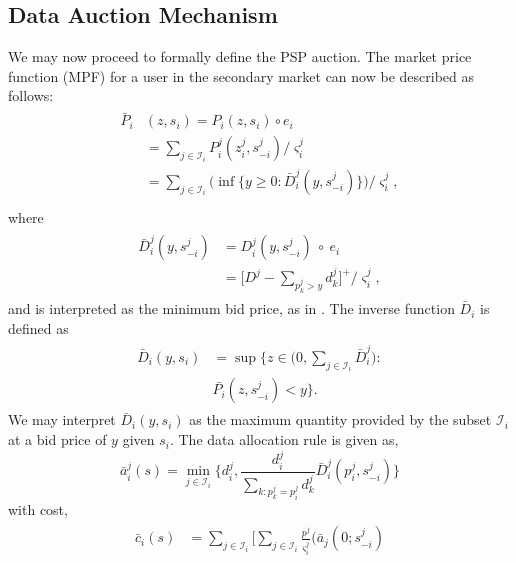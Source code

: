 \documentclass[12pt]{article}
\theoremstyle{definition}
\newcommand{\vs}{\varsigma}
\newcommand{\mcI}{\mathcal{I}}
\begin{document}
\begin{multicols}{2}
\subsection{Data Auction Mechanism}
We may now proceed to formally define the PSP auction.
The market price function (MPF) for a user in the secondary market
can now be described as follows:
\begin{align}\label{dataprice}
\begin{split}
    \bar{P}_i&(z, s_i) = P_i(z,s_i)\circ e_i \\
    &=\displaystyle\sum_{j\in\mcI_i}P_i^j(z_i^j,
s_{-i}^j)/\vs_i^j \\
    &= \sum_{j\in\mcI_i}\bigg(\inf\bigg\lbrace y\ge 0 : 
    {\bar{D}_i^j}(y,s_{-i}^j)\bigg\rbrace \bigg)/\vs_i^j,\\
\end{split}
\end{align}
where
\begin{align}
\begin{split}
    \bar{D}_i^j(y,s_{-i}^j) &= D_i^j(y,s_{-i}^j)\ \circ\ e_i\\
    &= \bigg\lbrack D^j - \sum_{p_k^j> y} d_k^j\bigg\rbrack^+/\vs_i^j,
\end{split}
\end{align}
and is interpreted as the minimum bid price, as in \cite{lazar}.
The inverse function
$\bar{D}_i$ is defined as
\begin{align}
\begin{split}
    \bar{D}_i(y, s_i) &= \sup\bigg\lbrace z\in \bigg( 0,
\sum_{j\in\mcI_i} \bar{D}_i^j \bigg) : \\
    &\bar{P_i}(z,s_{-i}^j) < y\bigg\rbrace.
\end{split}
\end{align}
We may interpret $\bar{D}_i(y, s_i)$ as the maximum quantity provided by the subset
$\mcI_i$ at a bid price of $y$ given $s_{i}$.
The data allocation rule is given as,
\begin{equation}\label{dataallocation}
    \bar{a}_i^j(s) = \min_{j\in\mcI_i}\big\lbrace d_i^j, \frac{d_i^j}{\sum_{k:p_k^j=
p_i^j}d_k^j}
\bar{D}_i^j(p_i^j,s_{-i}^j)\big\rbrace
\end{equation}
with cost,
\begin{align}\label{dataprice}
\begin{split}
    \bar{c}_i(s) &= \displaystyle\sum_{j\in\mcI_i}\bigg\lbrack\sum_{j\in\mcI_i}
\frac{p^j}{\vs_i^j} \bigg(\bar{a}_j(0; s_{-i}^j)\\

\end{split}
\end{align}
\end{multicols}
\end{document}
